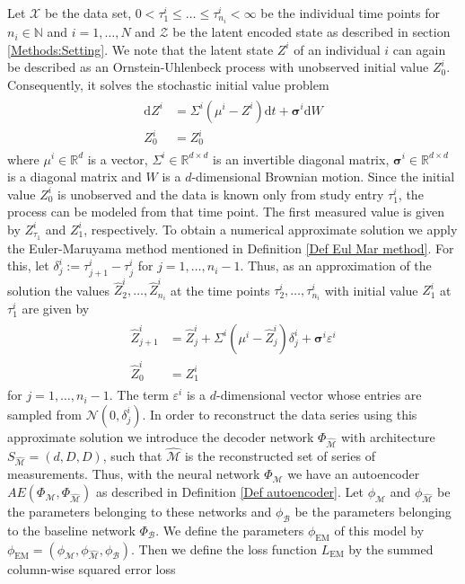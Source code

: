 \documentclass[11pt,titlepage]{article}
\newcommand{\R}{\mathbb{R}} %
\newcommand{\N}{\mathbb{N}} %
\theoremstyle{definition}
\theoremstyle{remark}
\begin{document}
	Let $\mathcal{X}$ be the data set, $0<\tau^i_1\leq \ldots\leq \tau^i_{n_i}<\infty$ be the individual time points for $n_i\in\N$ and $i=1,\ldots,N$ and $\mathcal{Z}$ be the latent encoded state as described in section \ref{Methods:Setting}. 
	We note that the latent state $Z^i$ of an individual $i$ can again be described as an Ornstein-Uhlenbeck process with unobserved initial 
	value $Z_0^i$. Consequently, it solves the stochastic initial value problem
	\begin{align*}
		\begin{split} 
			\mathrm{d}Z^i &= \Sigma^i(\mu^i- Z^i)\mathrm{d}t +\boldsymbol{\sigma}^i \mathrm{d}W\\
			Z^i_0 &= Z^i_0
		\end{split} 
	\end{align*}
	where $\mu^i\in\R^d$ is a vector, $\Sigma^i\in\R^{d\times d}$ is an invertible diagonal matrix, $\boldsymbol{\sigma}^i\in\R^{d\times d}$ is a diagonal matrix and $W$ is a $d$-dimensional Brownian motion. Since the initial value $Z_0^i$ is unobserved and the data is known only from study entry $\tau^i_1$, the process can be modeled from that time point. The first measured value is given by  $Z^i_{\tau_1}$ and $Z^i_1$, respectively. 
	To obtain a numerical approximate solution we apply the Euler-Maruyama method mentioned in Definition \ref{Def Eul Mar method}. For this, let $\delta^i_{j}:= \tau^i_{j+1}-\tau^i_{j}$ for $j=1,\ldots,n_i -1$. 
	Thus, as an approximation of the solution the values $\hat{Z}^i_2,\ldots, \hat{Z}^i_{n_i}$ at the time points $\tau^i_2,\ldots,\tau^i_{n_i}$ with initial value $Z^i_1$ at $\tau^i_1$ are given by
	\begin{align*}
		\begin{split} 
			\hat{Z}^i_{j+1} &= \hat{Z}^i_{j} + \Sigma^i(\mu^i- \hat{Z}_{j}^i)\delta^i_j +\boldsymbol{\sigma}^i \varepsilon^i\\
			\hat{Z}^i_0 &= Z^i_1
		\end{split} 
	\end{align*}
	for $j=1,\ldots, n_i -1$. The term $\varepsilon^i$ is a $d$-dimensional vector whose entries are sampled from $\mathcal{N}(0,\delta^i_j)$. In order to reconstruct the data series using this approximate solution we introduce the decoder network $\Phi_{\hat{\mathcal{M}}}$ with architecture $S_{\hat{\mathcal{M}}}=(d,D,D)$, such that $\hat{\mathcal{M}}$ is the reconstructed set of series of measurements. Thus, with the neural network $\Phi_\mathcal{M}$ we have an autoencoder $AE(\Phi_\mathcal{M},\Phi_{\hat{\mathcal{M}}})$ as described in Definition \ref{Def autoencoder}. Let $\phi_\mathcal{M}$ and $\phi_{\hat{\mathcal{M}}}$ be the parameters belonging to these networks and $\phi_\mathcal{B}$ be the parameters belonging to the baseline network $\Phi_\mathcal{B}$. We define the parameters $\phi_\mathrm{EM}$ of this model by $\phi_\mathrm{EM}= (\phi_\mathcal{M},\phi_{\hat{\mathcal{M}}}, \phi_\mathcal{B})$. Then we define the loss function $L_{\mathrm{EM}}$ by the summed column-wise squared error loss 
\end{document}
